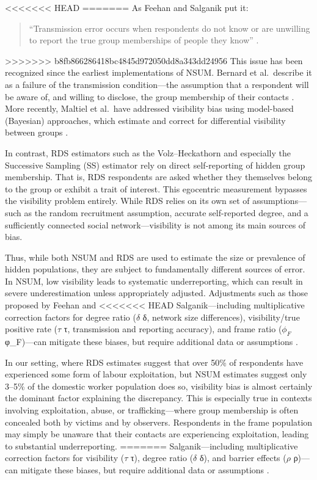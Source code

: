 \documentclass[
  12pt,
  letterpaper,
  DIV=11,
  numbers=noendperiod]{scrartcl}
\theoremstyle{plain}
\theoremstyle{definition}
\begin{document}
{<<<<<<< HEAD
=======
As Feehan and Salganik put it:

\begin{quote}
``Transmission error occurs when respondents do not know or are
unwilling to report the true group memberships of people they know''
\autocite[155]{feeh16-generalizing}.
\end{quote}

>>>>>>> b8fb866286418bc4845d972050dd8a343dd24956
This issue has been recognized since the earliest implementations of
NSUM. Bernard et al.~describe it as a failure of the transmission
condition---the assumption that a respondent will be aware of, and
willing to disclose, the group membership of their contacts
\autocite{bern10-counting}. More recently, Maltiel et al.~have addressed
visibility bias using model-based (Bayesian) approaches, which estimate
and correct for differential visibility between groups
\autocite{malt15-estimating}.

In contrast, RDS estimators such as the Volz--Heckathorn and especially
the Successive Sampling (SS) estimator rely on direct self-reporting of
hidden group membership. That is, RDS respondents are asked whether they
themselves belong to the group or exhibit a trait of interest. This
egocentric measurement bypasses the visibility problem entirely. While
RDS relies on its own set of assumptions---such as the random
recruitment assumption, accurate self-reported degree, and a
sufficiently connected social network---visibility is not among its main
sources of bias.

Thus, while both NSUM and RDS are used to estimate the size or
prevalence of hidden populations, they are subject to fundamentally
different sources of error. In NSUM, low visibility leads to systematic
underreporting, which can result in severe underestimation unless
appropriately adjusted. Adjustments such as those proposed by Feehan and
<<<<<<< HEAD
Salganik---including multiplicative correction factors for degree ratio
(\(\delta\) δ, network size differences), visibility/true positive rate
(\(\tau\) τ, transmission and reporting accuracy), and frame ratio
(\(\phi_F\) φ\_F)---can mitigate these biases, but require additional
data or assumptions \autocite{feeh16-generalizing}.

In our setting, where RDS estimates suggest that over 50\% of
respondents have experienced some form of labour exploitation, but NSUM
estimates suggest only 3--5\% of the domestic worker population does so,
visibility bias is almost certainly the dominant factor explaining the
discrepancy. This is especially true in contexts involving exploitation,
abuse, or trafficking---where group membership is often concealed both
by victims and by observers. Respondents in the frame population may
simply be unaware that their contacts are experiencing exploitation,
leading to substantial underreporting.
=======
Salganik---including multiplicative correction factors for visibility
(\(\tau\) τ), degree ratio (\(\delta\) δ), and barrier effects (\(\rho\)
ρ)---can mitigate these biases, but require additional data or
assumptions \autocite{feeh16-generalizing}.

}
\end{document}
